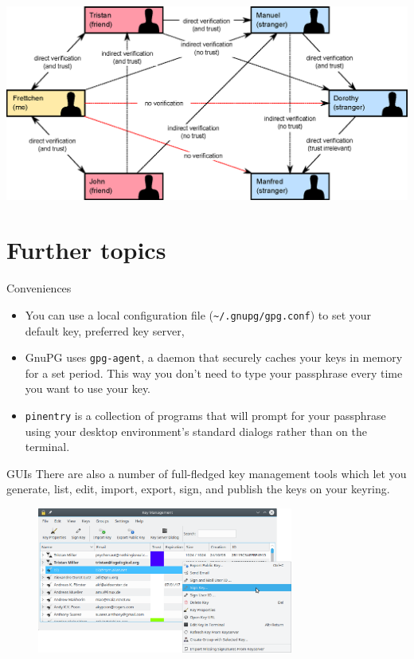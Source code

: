 \documentclass[
mode=present,
paper=smartboard,
size=20pt,
]{powerdot}
\begin{document}
\begin{slide}[toc=]{}
\centering\includegraphics[width=\linewidth]{images/Web_of_Trust_2.eps}
\end{slide}

\section{Further topics}

\begin{slide}{Conveniences}
  \begin{itemize}
  \item You can use a local configuration file
    (\texttt{\textasciitilde /.gnupg/gpg.conf}) to set your default
    key, preferred key server, \etc
  \item GnuPG uses \texttt{gpg-agent}, a daemon that securely caches
    your keys in memory for a set period. This way you don't need to
    type your passphrase every time you want to use your key.
  \item \texttt{pinentry} is a collection of programs that will prompt
    for your passphrase using your desktop environment's standard
    dialogs rather than on the terminal.
  \end{itemize}
\end{slide}

\begin{slide}{GUIs}
  There are also a number of full-fledged key management tools which
  let you generate, list, edit, import, export, sign, and publish the
  keys on your keyring.
  \begin{figure}[H]
    \centering
    \includegraphics[width=0.75\textwidth]{images/kgpg1.eps}
    \label{fig:kgpg1}
  \end{figure}
\end{slide}
\end{document}
